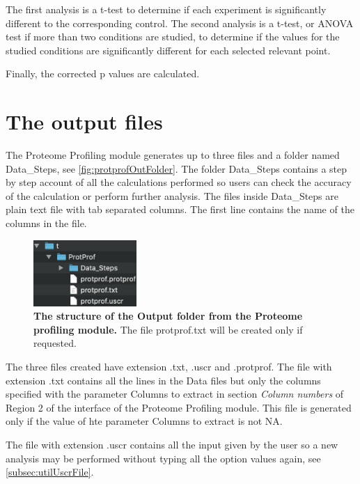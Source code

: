 The first analysis is a t-test to determine if each experiment is significantly different to the corresponding control. The second analysis is a t-test, or ANOVA test if more than two conditions are studied, to determine if the values for the studied conditions are significantly different for each selected relevant point.

Finally, the corrected p values are calculated.

\section{The output files}

The Proteome Profiling module generates up to three files and a folder named Data\_Steps, see \autoref{fig:protprofOutFolder}. The folder Data\_Steps contains a step by step account of all the calculations performed so users can check the accuracy of the calculation or perform further analysis. The files inside Data\_Steps are plain text file with tab separated columns. The first line contains the name of the columns in the file.  

\begin{figure}[h]
	\centering
	\includegraphics[width=0.35\textwidth]{./IMAGES/MOD-PROTPROF/protprof-files.jpg}	    
	\caption[The structure of the Output folder from the Proteome Profiling module]{\textbf{The structure of the Output folder from the Proteome profiling module.} The file protprof.txt will be created only if requested.} 
	\label{fig:protprofOutFolder}
	\vspace{-5pt} 	
\end{figure}

The three files created have extension .txt, .uscr and .protprof. The file with extension .txt contains all the lines in the Data files but only the columns specified with the parameter Columns to extract in section \textit{Column numbers} of Region \num{2} of the interface of the Proteome Profiling module. This file is generated only if the value of hte parameter Columns to extract is not NA. 

The file with extension .uscr contains all the input given by the user so a new analysis may be performed without typing all the option values again, see \autoref{subsec:utilUscrFile}. 


